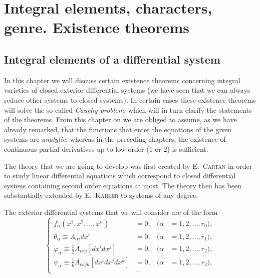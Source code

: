 \documentclass[leqno,11pt]{book}
\numberwithin{equation}{chapter}
\theoremstyle{shape1}
\theoremstyle{shape0}
\theoremstyle{shape2}
\theoremstyle{definition}
\begin{document}
\chapter{Integral elements, characters, genre. Existence theorems}
\label{cha:integr-elem-char}

\section{Integral elements of a differential system}
\label{sec:integr-elem-diff}

\fsec In this chapter we will discuss certain existence theorems concerning  integral varieties of closed exterior differential systems (we have seen that we can always reduce other systems to closed systems). In certain cases these existence theorems will solve the so-called \emph{Cauchy problem}, which will in turn clarify the statements of the theorems. From this chapter on we are obliged to assume, as we have already remarked, that the functions that enter the equations of the given systems are \emph{analytic}, whereas in the preceding chapters,  the existence of continuous partial derivatives up to low order ($1$ or $2$) is sufficient.

The theory that we are going to develop was first created by \textsc{E.~Cartan} in order to study linear differential equations which correspond to closed differential systens containing second order equations at most. The theory then has been substantially extended by \textsc{E.~K\"ahler} to systems of any degree.




\vspace{12pt}\fsec The exterior differential systems that we will consider are of the form
\begin{equation}
  \label{eq:4.1}
  \left\{
    \begin{aligned}
      f_{\alpha}(x^{1},x^{2},\dots,x^{n})&=0,&(\alpha&=1,2,\dots,r_{0}),\\
      \theta_{\alpha}\equiv A_{\alpha i}dx^{i}&=0,&(\alpha&=1,2,\dots,r_{1}),\\
      \varphi_{\alpha}\equiv\frac{1}{2}A_{\alpha ij}[dx^{i}dx^{j}]&=0,&(\alpha&=1,2,\dots,r_{2}),\\
      \psi_{\alpha}\equiv\frac{1}{6}A_{\alpha ijk}[dx^{i}dx^{j}dx^{k}]&=0,&(\alpha&=1,2,\dots,r_{3}),\\
      &\hdots
    \end{aligned}
  \right.
\end{equation}
\end{document}
